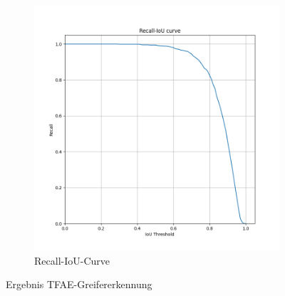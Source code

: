 \begin{figure}[h]
\begin{subfigure}[c]{0.32\textwidth}
			\includegraphics[width=1\textwidth, center]{bilder/Hauptteil/MT_Grapple/Recall_IoU.png}
			\caption{Recall-IoU-Curve}
			\label{img:RecalllIoUt_MT}	
		\end{subfigure}
		\caption{Ergebnis TFAE-Greifererkennung}
		\label{img:ErgebnisRegressionMT}
	\end{figure}


